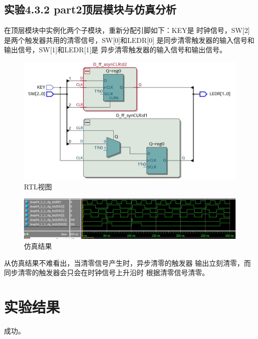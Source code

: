 \documentclass[12pt,a4paper,UTF8]{article}
\begin{document}
\subsection{实验4.3.2 part2顶层模块与仿真分析}
在顶层模块中实例化两个子模块，重新分配引脚如下：KEY是
时钟信号，SW[2]是两个触发器共用的清零信号，SW[0]和LEDR[0]
是同步清零触发器的输入信号和输出信号，SW[1]和LEDR[1]是
异步清零触发器的输入信号和输出信号。
\begin{figure}[H]
  \centering
  \includegraphics[width=1\textwidth]{rtl_top.JPG}
  \caption{RTL视图}
  \label{rtl_top}
\end{figure}
\begin{figure}[H]
  \centering
  \includegraphics[width=1\textwidth]{sim_top.JPG}
  \caption{仿真结果}
  \label{sim_top}
\end{figure}

从仿真结果不难看出，当清零信号产生时，异步清零的触发器
输出立刻清零，而同步清零的触发器会只会在时钟信号上升沿时
根据清零信号清零。

\section{实验结果}
成功。
\end{document}
